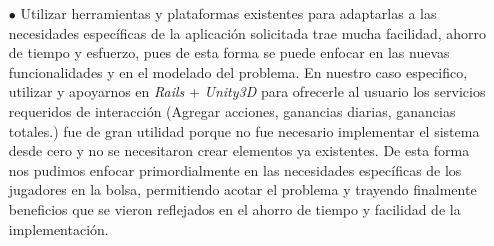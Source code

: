\begin{itemize}
\item[$\bullet$] Utilizar herramientas y plataformas existentes para adaptarlas a las necesidades específicas de la aplicación solicitada trae mucha facilidad, ahorro de tiempo y esfuerzo, pues de esta forma se puede enfocar en las nuevas funcionalidades y en el modelado del problema. En nuestro caso especifico, utilizar y apoyarnos en \emph{Rails} + \emph{Unity3D} para ofrecerle al usuario los servicios requeridos de interacción (Agregar acciones, ganancias diarias, ganancias totales.) fue de gran utilidad porque no fue necesario implementar el sistema desde cero y no se necesitaron crear elementos ya existentes. De esta forma nos pudimos enfocar primordialmente en las necesidades específicas de los jugadores en la bolsa, permitiendo acotar el problema y trayendo finalmente beneficios que se vieron reflejados en el ahorro de tiempo y facilidad de la implementación.	
	
\end{itemize}
